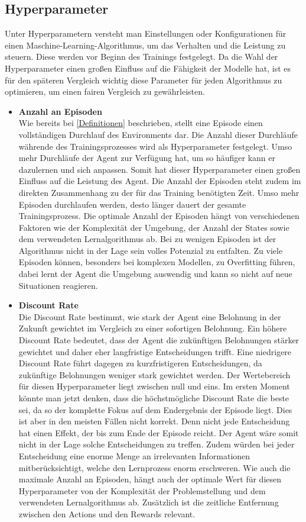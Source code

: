 \subsection{Hyperparameter}\label{Def_Hyperparameter}
Unter Hyperparametern versteht man Einstellungen oder Konfigurationen für einen Maschine-Learning-Algorithmus, um das Verhalten und die Leistung zu steuern. Diese werden vor Beginn des Trainings festgelegt. Da die Wahl der Hyperparameter einen großen Einfluss auf die Fähigkeit der Modelle hat, ist es für den späteren Vergleich wichtig diese Parameter für jeden Algorithmus zu optimieren, um einen fairen Vergleich zu gewährleisten.
\begin{itemize}
    \item \textbf{Anzahl an Episoden}\\
    Wie bereits bei \ref*{Definitionen}  beschrieben, stellt eine Episode einen vollständigen Durchlauf des Environments dar. Die Anzahl dieser Durchläufe währende des Trainingsprozesses wird als Hyperparameter festgelegt. Umso mehr Durchläufe der Agent zur Verfügung hat, um so häufiger kann er dazulernen und sich anpassen. Somit hat dieser Hyperparameter einen großen Einfluss auf die Leistung des Agent. Die Anzahl der Episoden steht zudem im direkten Zusammenhang zu der für das Training benötigten Zeit. Umso mehr Episoden durchlaufen werden, desto länger dauert der gesamte Trainingsprozess. Die optimale Anzahl der Episoden hängt von verschiedenen Faktoren wie der Komplexität der Umgebung, der Anzahl der States sowie dem verwendeten Lernalgorithmus ab. Bei zu wenigen Episoden ist der Algorithmus nicht in der Lage sein volles Potenzial zu entfalten. Zu viele Episoden können, besonders bei komplexen Modellen, zu Overfitting führen, dabei lernt der Agent die Umgebung auswendig und kann so nicht auf neue Situationen reagieren.
    \item \textbf{Discount Rate}\\
    Die Discount Rate bestimmt, wie stark der Agent eine Belohnung in der Zukunft gewichtet im Vergleich zu einer sofortigen Belohnung. Ein höhere Discount Rate bedeutet, dass der Agent die zukünftigen Belohnungen stärker gewichtet und daher eher langfristige Entscheidungen trifft. Eine niedrigere Discount Rate führt dagegen zu kurzfristigeren Entscheidungen, da zukünftige Belohnungen weniger stark gewichtet werden. Der Wertebereich für diesen Hyperparameter liegt zwischen null und eins. Im ersten Moment könnte man jetzt denken, dass die höchstmögliche Discount Rate die beste sei, da so der komplette Fokus auf dem Endergebnis der Episode liegt. Dies ist aber in den meisten Fällen nicht korrekt. Denn nicht jede Entscheidung hat einen Effekt, der bis zum Ende der Episode reicht. Der Agent wäre somit nicht in der Lage solche Entscheidungen zu treffen. Zudem würden bei jeder Entscheidung eine enorme Menge an irrelevanten Informationen mitberücksichtigt, welche den Lernprozess enorm erschweren. Wie auch die maximale Anzahl an Episoden, hängt auch der optimale Wert für diesen Hyperparameter von der Komplexität der Problemstellung und dem verwendeten Lernalgorithmus ab. Zusätzlich ist die zeitliche Entfernung zwischen den Actions und den Rewards relevant.

\end{itemize}
